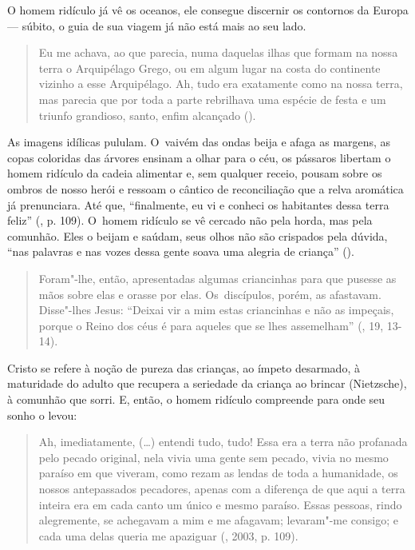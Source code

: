O homem ridículo já vê os oceanos, ele consegue discernir os contornos
da Europa --- súbito, o guia de sua viagem já não está mais ao seu lado.

\begin{quote}
Eu me achava, ao que parecia, numa daquelas ilhas que formam na nossa
terra o Arquipélago Grego, ou em algum lugar na costa do continente
vizinho a esse Arquipélago. Ah, tudo era exatamente como na nossa terra,
mas parecia que por toda a parte rebrilhava uma espécie de festa e um
triunfo grandioso, santo, enfim alcançado ().
\end{quote}

As imagens idílicas pululam. O~vaivém das ondas beija e afaga as
margens, as copas coloridas das árvores ensinam a olhar para o céu, os
pássaros libertam o homem ridículo da cadeia alimentar e, sem qualquer
receio, pousam sobre os ombros de nosso herói e ressoam o cântico de
reconciliação que a relva aromática já prenunciara. Até que,
``finalmente, eu vi e conheci os habitantes dessa terra feliz'' (,
p. 109). O~homem ridículo se vê cercado não pela horda, mas pela
comunhão. Eles o beijam e saúdam, seus olhos não são crispados pela
dúvida, ``nas palavras e nas vozes dessa gente soava uma alegria de
criança'' ().

\begin{quote}
Foram"-lhe, então, apresentadas algumas criancinhas para que pusesse as
mãos sobre elas e orasse por elas. Os~discípulos, porém, as afastavam.
Disse"-lhes Jesus: ``Deixai vir a mim estas criancinhas e não as
impeçais, porque o Reino dos céus é para aqueles que se lhes
assemelham'' (, 19, 13-14).
\end{quote}

Cristo se refere à noção de pureza das crianças, ao ímpeto desarmado, à
maturidade do adulto que recupera a seriedade da criança ao brincar
(Nietzsche), à comunhão que sorri. E, então, o homem ridículo compreende
para onde seu sonho o levou:

\begin{quote}
Ah, imediatamente, (\ldots) entendi tudo, tudo! Essa era a terra não
profanada pelo pecado original, nela vivia uma gente sem pecado, vivia
no mesmo paraíso em que viveram, como rezam as lendas de toda a
humanidade, os nossos antepassados pecadores, apenas com a diferença de
que aqui a terra inteira era em cada canto um único e mesmo paraíso.
Essas pessoas, rindo alegremente, se achegavam a mim e me afagavam;
levaram"-me consigo; e cada uma delas queria me apaziguar (,
2003, p. 109).
\end{quote}


